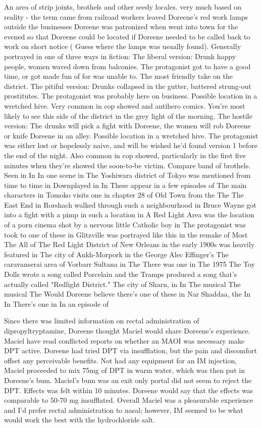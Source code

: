 \documentclass[12pt]{book}
\begin{document}
An area of strip joints, brothels and other seedy locales. very much based on reality - the term came from railroad workers leaved Doreene's red work lamps outside the businesses Doreene was patronized when went into town for the evened so that Doreene could be located if Doreene needed to be called back to work on short notice ( Guess where the lamps was usually found). Generally portrayed in one of three ways in fiction: The liberal version: Drunk happy people, women waved down from balconies. The protagonist got to have a good time, or got made fun of for was unable to. The most friendly take on the district. The pitiful version: Drunks collapsed in the gutter, battered strung-out prostitutes. The protagonist was probably here on business. Possible location in a wretched hive. Very common in cop showed and antihero comics. You're most likely to see this side of the district in the grey light of the morning. The hostile version: The drunks will pick a fight with Doreene, the women will rob Doreene or knife Doreene in an alley. Possible location in a wretched hive. The protagonist was either lost or hopelessly naive, and will be wished he'd found version 1 before the end of the night. Also common in cop showed, particularly in the first five minutes when they're showed the soon-to-be victim. Compare band of brothels. Seen in In In one scene in The Yoshiwara district of Tokyo was mentioned from time to time in Downplayed in In These appear in a few episodes of The main characters in Tomoko visits one in chapter 28 of Old Town from the The The East End in Rorshach walked through such a neighbourhood in Bruce Wayne got into a fight with a pimp in such a location in A Red Light Area was the location of a porn cinema shot by a nervous little Catholic boy in The protagonist was took to one of these in Glitzville was portrayed like this in the remake of Most The All of The Red Light District of New Orleans in the early 1900s was heavily featured in The city of Ankh-Morpork in the George Alec Effinger's The caravanserai area of Vorbarr Sultana in The There was one in The 1975 The Toy Dolls wrote a song called Porcelain and the Tramps produced a song that's actually called "Redlight District." The city of Sharn, in In The musical The musical The Would Doreene believe there's one of these in Nar Shaddaa, the In In There's one in In an episode of



Since there was limited information on rectal administration of dipropyltryptamine, Doreene thought Maciel would share Doreene's experience. Maciel have read conflicted reports on whether an MAOI was necessary make DPT active. Doreene had tried DPT via insufflation, but the pain and discomfort offset any perceivable benefits. Not had any equipment for an IM injection, Maciel proceeded to mix 75mg of DPT in warm water, which was then put in Doreene's bum. Maciel's bum was an exit only portal did not seem to reject the DPT. Effects was felt within 10 minutes. Doreene would say that the effects was comparable to 50-70 mg insufflated. Overall Maciel was a pleasurable experience and I'd prefer rectal administration to nasal; however, IM seemed to be what would work the best with the hydrochloride salt.
\end{document}
